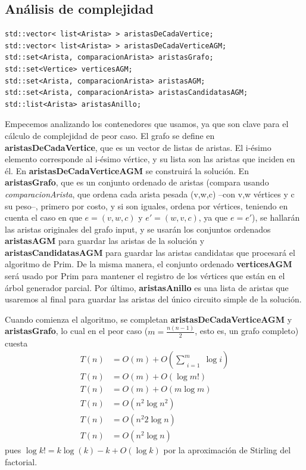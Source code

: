 \newpage

\subsection{Análisis de complejidad}

\begin{minipage}{\linewidth}
\begin{lstlisting}[basicstyle=\normalsize\ttfamily, frame=single]
std::vector< list<Arista> > aristasDeCadaVertice;
std::vector< list<Arista> > aristasDeCadaVerticeAGM;
std::set<Arista, comparacionArista> aristasGrafo;
std::set<Vertice> verticesAGM;
std::set<Arista, comparacionArista> aristasAGM;
std::set<Arista, comparacionArista> aristasCandidatasAGM;
std::list<Arista> aristasAnillo;
\end{lstlisting}
\end{minipage}

Empecemos analizando los contenedores que usamos, ya que son clave para el cálculo de complejidad de peor caso. El grafo se define en \textbf{aristasDeCadaVertice}, que es un vector de listas de aristas. El i-ésimo elemento corresponde al i-ésimo vértice, y su lista son las aristas que inciden en él. En \textbf{aristasDeCadaVerticeAGM} se construirá la solución. En \textbf{aristasGrafo}, que es un conjunto ordenado de aristas (compara usando \emph{comparacionArista}, que ordena cada arista pesada (v,w,c) --con v,w vértices y c su peso--, primero por costo, y si son iguales, ordena por vértices, teniendo en cuenta el caso en que $e = (v,w,c)$ y $e' = (w,v,c)$, ya que $e = e'$), se hallarán las aristas originales del grafo input, y se usarán los conjuntos ordenados \textbf{aristasAGM} para guardar las aristas de la solución y \textbf{aristasCandidatasAGM} para guardar las aristas candidatas que procesará el algoritmo de Prim. De la misma manera, el conjunto ordenado \textbf{verticesAGM} será usado por Prim para mantener el registro de los vértices que están en el árbol generador parcial. Por último, \textbf{aristasAnillo} es una lista de aristas que usaremos al final para guardar las aristas del único circuito simple de la solución.

Cuando comienza el algoritmo, se completan \textbf{aristasDeCadaVerticeAGM} y \textbf{aristasGrafo}, lo cual en el peor caso ($m = \frac{n (n - 1)}{2}$, esto es, un grafo completo) cuesta
\begin{align*}
T(n) &= O(m) + O\left(\sum\limits_{\substack{i = 1}}^m \log i\right) \\
T(n) &= O(m) + O(\log m!) \\
T(n) &= O(m) + O(m \log m) \\
T(n) &= O(n^2 \log n^2) \\
T(n) &= O(n^2 2\log n) \\
T(n) &= O(n^2 \log n)
\end{align*}
pues $\log k! = k \log(k) - k + O(\log k)$ por la aproximación de Stirling del factorial.

